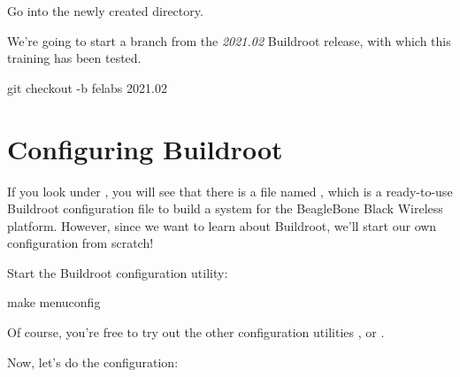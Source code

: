 Go into the newly created  directory.

We're going to start a branch from the {\em 2021.02} Buildroot
release, with which this training has been tested.

\begin{bashinput}
git checkout -b felabs 2021.02
\end{bashinput}

\section{Configuring Buildroot}

If you look under , you will see that there is a file
named , which is a ready-to-use Buildroot
configuration file to build a system for the BeagleBone Black Wireless
platform. However, since we want to learn about Buildroot, we'll start
our own configuration from scratch!

Start the Buildroot configuration utility:

\begin{bashinput}
make menuconfig
\end{bashinput}

Of course, you're free to try out the other configuration utilities
,  or .

Now, let's do the configuration:

